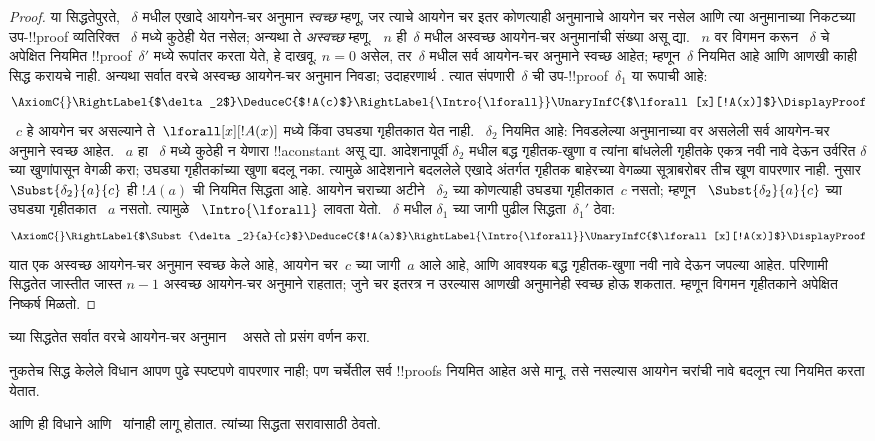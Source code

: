 \documentclass[../../../include/open-logic-section]{subfiles}
\begin{document}
\begin{proof}
या सिद्धतेपुरते,
~$\delta$ मधील एखादे
आयगेन-चर अनुमान
\emph{स्वच्छ} म्हणू,
जर त्याचे आयगेन चर
इतर कोणत्याही अनुमानाचे
आयगेन चर नसेल आणि
त्या अनुमानाच्या निकटच्या
उप-!!{proof} व्यतिरिक्त
~$\delta$ मध्ये
कुठेही येत नसेल;
अन्यथा ते \emph{अस्वच्छ}
म्हणू. ~$n$ ही~$\delta$
मधील अस्वच्छ आयगेन-चर
अनुमानांची संख्या असू द्या.
~$n$ वर विगमन करून
~$\delta$ चे अपेक्षित
नियमित !!{proof}~$\delta'$
मध्ये रूपांतर करता येते,
हे दाखवू. $n=0$ असेल,
तर~$\delta$ मधील सर्व
आयगेन-चर अनुमाने स्वच्छ
आहेत; म्हणून~$\delta$
नियमित आहे आणि आणखी
काही सिद्ध करायचे नाही.
अन्यथा सर्वात वरचे
अस्वच्छ आयगेन-चर अनुमान
निवडा; उदाहरणार्थ
\Intro{\lforall}.
त्यात संपणारी~$\delta$
ची उप-!!{proof}~$\delta_1$
या रूपाची आहे:
    \[
    \AxiomC{}
    \RightLabel{$\delta_2$}
    \DeduceC{$!A(c)$}
    \RightLabel{\Intro{\lforall}}
    \UnaryInfC{$\lforall[x][!A(x)]$}
    \DisplayProof
    \]
~$c$ हे आयगेन चर असल्याने
ते~$\lforall[x][!A(x)]$
मध्ये किंवा उघड्या गृहीतकात
येत नाही. ~$\delta_2$
नियमित आहे: निवडलेल्या
अनुमानाच्या वर असलेली
सर्व आयगेन-चर अनुमाने
स्वच्छ आहेत. ~$a$ हा
~$\delta$ मध्ये कुठेही
न येणारा !!a{constant}
असू द्या. आदेशनापूर्वी $\delta_2$ मधील
बद्ध गृहीतक-खुणा व त्यांना बांधलेली गृहीतके एकत्र
नवी नावे देऊन उर्वरित $\delta$ च्या खुणांपासून
वेगळी करा; उघड्या गृहीतकांच्या खुणा बदलू नका.
त्यामुळे आदेशनाने बदललेले एखादे अंतर्गत गृहीतक
बाहेरच्या वेगळ्या सूत्राबरोबर तीच खूण वापरणार नाही.
नुसार
$\Subst{\delta_2}{a}{c}$
ही $!A(a)$ ची नियमित
सिद्धता आहे.
आयगेन चराच्या अटीने
~$\delta_2$ च्या कोणत्याही
उघड्या गृहीतकात~$c$
नसतो; म्हणून
~$\Subst{\delta_2}{a}{c}$
च्या उघड्या गृहीतकात
~$a$ नसतो. त्यामुळे
~$\Intro{\lforall}$
लावता येतो.
~$\delta$ मधील
$\delta_1$ च्या जागी
पुढील सिद्धता~$\delta_1'$
ठेवा:
    \[
    \AxiomC{}
    \RightLabel{$\Subst{\delta_2}{a}{c}$}
    \DeduceC{$!A(a)$}
    \RightLabel{\Intro{\lforall}}
    \UnaryInfC{$\lforall[x][!A(x)]$}
    \DisplayProof
    \]
यात एक अस्वच्छ आयगेन-चर
अनुमान स्वच्छ केले आहे,
आयगेन चर~$c$ च्या जागी~$a$ आले आहे,
आणि आवश्यक बद्ध गृहीतक-खुणा नवी नावे देऊन जपल्या आहेत.
परिणामी सिद्धतेत
जास्तीत जास्त $n-1$ अस्वच्छ आयगेन-चर
अनुमाने राहतात; जुने चर इतरत्र न उरल्यास
आणखी अनुमानेही स्वच्छ होऊ शकतात. म्हणून
विगमन गृहीतकाने अपेक्षित
निष्कर्ष मिळतो.
\end{proof}

\begin{prob}
 च्या
सिद्धतेत सर्वात वरचे
आयगेन-चर अनुमान
~\Elim{\lexists} असते
तो प्रसंग वर्णन करा.
\end{prob}

नुकतेच सिद्ध केलेले
विधान आपण पुढे स्पष्टपणे
वापरणार नाही; पण चर्चेतील
सर्व !!{proof}s नियमित
आहेत असे मानू.
तसे नसल्यास आयगेन
चरांची नावे बदलून त्या
नियमित करता येतात.

आणि 
ही विधाने 
आणि~
यांनाही लागू होतात.
त्यांच्या सिद्धता
सरावासाठी ठेवतो.
\end{document}
